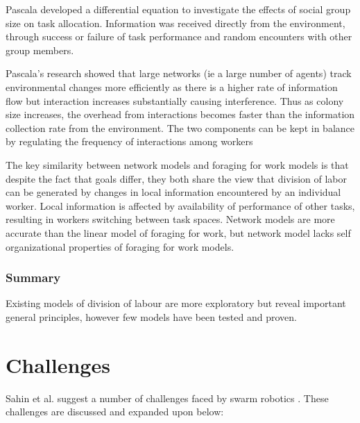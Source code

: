 Pascala \cite{pacala1996effects} developed a differential equation to investigate the effects of social group size on task allocation. Information was received directly from the environment, through success or failure of task performance and random encounters with other group members.

Pascala's research showed that large networks (ie a large number of agents) track environmental changes more efficiently as there is a higher rate of information flow but interaction increases substantially causing interference. Thus as colony size increases, the overhead from interactions becomes faster than the information collection rate from the environment. The two components can be kept in balance by regulating the frequency of interactions among workers \cite{pacala1996effects} %

The key similarity between network models and foraging for work models is that despite the fact that goals differ, they both share the view that division of labor can be generated by changes in local information encountered by an individual worker. Local information is affected by availability of performance of other tasks, resulting in workers switching between task spaces. Network models are more accurate than the linear model of foraging for work, but network model lacks self organizational properties of foraging for work models.

\subsubsection{Summary} 
Existing models of division of labour are more exploratory but reveal important general principles, however few models have been tested and proven.

\section{Challenges}
Sahin et al. suggest a number of challenges faced by swarm robotics \cite{csahin2008special}. These challenges are discussed and expanded upon below: 

